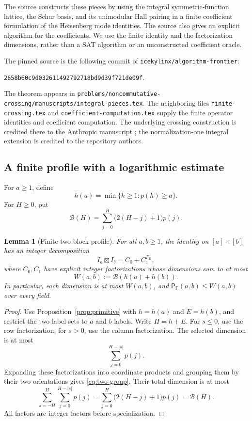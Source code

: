 \documentclass[11pt]{article}
\newtheorem{lemma}[theorem]{Lemma}
\theoremstyle{definition}
\theoremstyle{remark}
\newcommand{\F}{\mathbb F}
\newcommand{\Bnd}{\mathcal B}
\newcommand{\cross}{\mathsf P}
\begin{document}
The source constructs these pieces by using the integral
symmetric-function lattice, the Schur basis, and its unimodular
Hall pairing in a finite coefficient formulation of the Heisenberg
mode identities. The source also gives an explicit algorithm for
the coefficients. We use the finite identity and the factorization
dimensions, rather than a SAT algorithm or an unconstructed
coefficient oracle.

The pinned source is the following commit of
\texttt{icekylinx/algorithm-frontier}:
\begin{center}
\texttt{2658b60c9d032611492792718bd9d39f721de09f}.
\end{center}
The theorem appears in
\nolinkurl{problems/noncommutative-crossing/manuscripts/integral-pieces.tex}.
The neighboring files \texttt{finite-crossing.tex} and
\texttt{coefficient-computation.tex} supply the finite operator
identities and coefficient computation. The underlying crossing
construction is credited there to the Anthropic manuscript
\cite{anthropic}; the normalization-one integral extension is
credited to the repository authors.

\subsection{A finite profile with a logarithmic estimate}

For $a\ge1$, define
\[
 h(a)=\min\{h\ge1:p(h)\ge a\}.
\]
For $H\ge0$, put
\begin{equation}
\label{eq:Bdef}
 \Bnd(H)=\sum_{j=0}^{H}\bigl(2(H-j)+1\bigr)p(j).
\end{equation}

\begin{lemma}[Finite two-block profile]
\label{lem:finite-profile}
For all $a,b\ge1$, the identity on $[a]\times[b]$ has an integer
decomposition
\begin{equation}
\label{eq:two-group}
 I_a\boxtimes I_b=C_0+C_1^{\Gamma_B},
\end{equation}
where $C_0,C_1$ have explicit integer factorizations whose
dimensions sum to at most
\[
 W(a,b):=\Bnd(h(a)+h(b)).
\]
In particular, each dimension is at most $W(a,b)$, and
$\cross_{\F}(a,b)\le W(a,b)$ over every field.
\end{lemma}

\begin{proof}
Use Proposition~\ref{prop:primitive} with $h=h(a)$ and $E=h(b)$,
and restrict the two label sets to $a$ and $b$ labels. Write
$H=h+E$. For $s\le0$, use the row factorization; for $s>0$, use
the column factorization. The selected dimension is at most
\[
 \sum_{j=0}^{H-|s|}p(j).
\]
Expanding these factorizations into coordinate products and
grouping them by their two orientations gives
\eqref{eq:two-group}. Their total dimension is at most
\[
 \sum_{s=-H}^{H}\sum_{j=0}^{H-|s|}p(j)
 =\sum_{j=0}^{H}\bigl(2(H-j)+1\bigr)p(j)=\Bnd(H).
\]
All factors are integer factors before specialization.
\end{proof}
\end{document}
